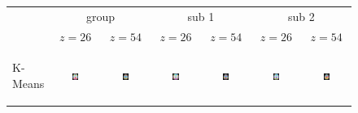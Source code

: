 \documentclass[runningheads,a4paper]{llncs}
\begin{document}
\begin{figure}[htb]
\centering
\begin{tabular}{lcc|cc|cc}
&
\multicolumn{2}{c|}{group} &
\multicolumn{2}{c|}{sub 1} &
\multicolumn{2}{c}{sub 2} \\
& $z = 26$ & $z=54$ & $z = 26$ & $z=54$ & $z = 26$ & $z=54$ \\
\begin{sideways} \footnotesize \textsf{K-Means} \end{sideways} &
\includegraphics[width=0.15\textwidth]{figure2/kmeans_grp_z25} &
\includegraphics[width=0.15\textwidth]{figure2/kmeans_grp_z32} &
\includegraphics[width=0.15\textwidth]{figure2/kmeans_sub1_z25} &
\includegraphics[width=0.15\textwidth]{figure2/kmeans_sub1_z32} &
\includegraphics[width=0.15\textwidth]{figure2/kmeans_sub2_z25} &
\includegraphics[width=0.15\textwidth]{figure2/kmeans_sub2_z32} \\

\end{tabular}
\end{figure}
\end{document}

